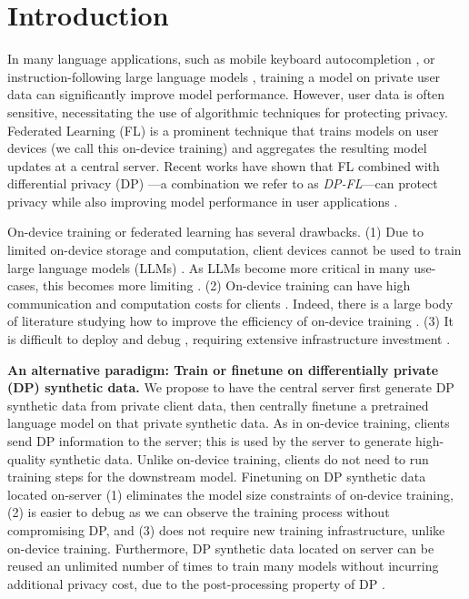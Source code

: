 \section{Introduction}
\label{sec:intro}
In many language applications, such as mobile keyboard autocompletion \citep{mcmahan2017learning}, or instruction-following large language models \citep{yu2024privacy}, training a model on private user data can significantly improve  model performance. 
However, user data is often sensitive, necessitating the use of algorithmic techniques for protecting privacy.  
Federated Learning (FL) \citep{pmlr-v54-mcmahan17a} is a prominent technique that trains models on user devices (we call this on-device training) and aggregates the resulting  model updates at a central server.  Recent works have shown that FL combined with differential privacy (DP) \citep{dwork2006differential}---a combination we refer to as \emph{DP-FL}---can protect privacy while also improving model performance in user applications \citep{mcmahan2017learning, kairouz2021practical, kairouz2021distributed, nguyen2022federated, xu2023learning}.

On-device training or federated learning has several drawbacks. (1) Due to limited on-device storage and computation, client devices cannot be used to train large language models (LLMs) \citep{radford2019language, touvron2023llama}.  
As LLMs become more critical in many use-cases, this becomes more limiting \cite{charles2023towards}. 
(2) On-device training can have high communication and computation costs for clients \citep{cai2022fedadapter}. Indeed, there is a large body of literature studying how to improve the efficiency of on-device training \citep{wang2020tackling, li2020federated, karimireddy2020scaffold, hou2021fedchain, wang2021field,mishchenko2022proxskip,sadiev2022communication,grudzien2023can}.
(3) It is difficult to deploy and debug \citep{augenstein2019generative}, requiring extensive infrastructure investment \citep{The_TensorFlow_Federated_Authors_TensorFlow_Federated_2018, flsim, pytorchios}. 



\textbf{An alternative paradigm: Train or finetune on differentially private (DP) synthetic data.}
We propose to have the central server first generate DP synthetic data from private client data, then centrally finetune a pretrained language model on that private synthetic data. 
As in on-device training, clients send DP information to the server; this is used by the server to generate high-quality synthetic data. Unlike on-device training, clients do not need to run training steps for the downstream model. Finetuning on DP synthetic data located on-server (1) eliminates the model size constraints of on-device training, (2) is easier to debug as we can observe the training process without compromising DP, and (3) does not require new training infrastructure, unlike on-device training. Furthermore, DP synthetic data located on server can be reused an unlimited number of times to train many models without incurring additional privacy cost, due to the post-processing property of DP \citep{dwork2006differential}.

